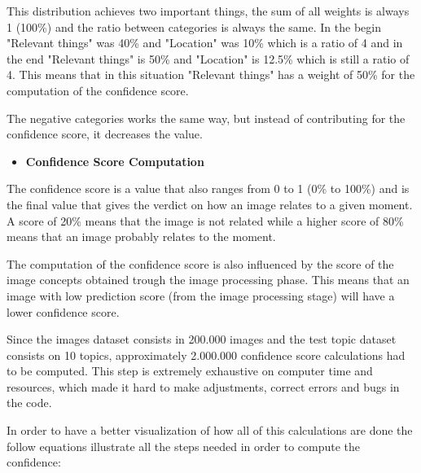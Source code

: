   This distribution achieves two important things, the sum of all weights is always 1 (100\%) and the ratio between categories is always the same. In the begin "Relevant things" was 40\% and "Location" was 10\%  which is a ratio of 4 and in the end "Relevant things" is 50\% and "Location" is 12.5\% which is still a ratio of 4. This means that in this situation "Relevant things" has a weight of 50\% for the computation of the confidence score.
   
   The negative categories works the same way, but instead of contributing for the confidence score, it decreases the value.

    

    \begin{itemize}
      \item \textbf{Confidence Score Computation}
    \end{itemize}

    The confidence score is a value that also ranges from 0 to 1 (0\% to 100\%) and is the final value that gives the verdict on how an image relates to a given moment. A score of 20\% means that the image is not related while a higher score of 80\% means that an image probably relates to the moment. 

    The computation of the confidence score is also influenced by the score of the image concepts obtained trough the image processing phase. This means that an image with low prediction score (from the image processing stage) will have a lower confidence score. 

    Since the images dataset consists in 200.000 images and the test topic dataset consists on 10 topics, approximately 2.000.000 confidence score calculations had to be computed. This step is extremely exhaustive on computer time and resources, which made it hard to make adjustments, correct errors and bugs in the code.
        
   


    In order to have a better visualization of how all of this calculations are done the follow equations illustrate all the steps needed in order to compute the confidence:

